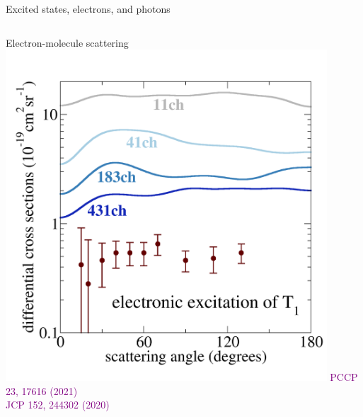 \documentclass[aspectratio=169,9pt]{beamer}
\newcommand{\pub}[1]{{\small \textcolor{purple}{#1}}}
\begin{document}
\begin{frame}{Excited states, electrons, and photons}
\begin{columns}
        \begin{column}{0.32\textwidth}
		\vspace{-0.5cm}
	\begin{block}{Electron-molecule scattering}
 		\includegraphics[width=0.90\textwidth]{fig/ethanol.png}
		\pub{PCCP 23, 17616 (2021)}
		\\
		\pub{JCP 152, 244302 (2020)}
		\\
        \end{block}

        \end{column}


\end{columns}
\end{frame}
\end{document}
